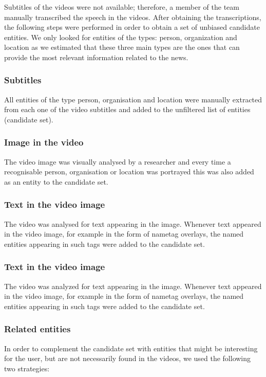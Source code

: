 \documentclass{llncs}
\begin{document}
Subtitles of the videos were not available; therefore, a member of the team manually transcribed the speech in the videos.  After obtaining the transcriptions, the following steps were performed in order to obtain a set of unbiased candidate entities. We only looked for entities of the types: person, organization and location as we estimated that these three main types are the ones that can provide the most relevant information related to the news.  

\subsubsection{Subtitles}
All entities of the type person, organisation and location were manually extracted from each one of the video subtitles and added to the unfiltered list of entities (candidate set). 

\subsubsection{Image in the video}
The video image was visually analysed by a researcher and every time a recognisable person, organisation or location was portrayed this was also added as an entity to the candidate set. 

\subsubsection{Text in the video image}
The video was analysed for text appearing in the image. Whenever text appeared in the video image, for example in the form of nametag overlays, the named entities appearing in such tags were added to the candidate set. 

\subsubsection{Text in the video image}
The video was analyzed for text appearing in the image. Whenever text appeared in the video image, for example in the form of nametag overlays, the named entities appearing in such tags were added to the candidate set. 

\subsubsection{Related entities }
In order to complement the candidate set with entities that might be interesting for the user, but are not necessarily found in the videos, we used the following two strategies:
\end{document}
